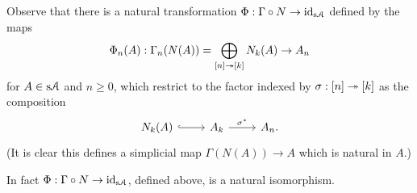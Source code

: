\begin{definition}
  Observe that there is
  a natural transformation $\Phi : \Gamma \circ N \to \operatorname{id}_{\mathrm{s}\mathcal{A}}$
  defined by the maps
  \[
  \Phi_n(A) : \Gamma_n(N(A)) = \bigoplus_{[n] \twoheadrightarrow [k]} N_k(A) \to A_n
  \]
  for $A \in \mathrm{s}\mathcal{A}$ and $n \ge 0$, which restrict to the factor indexed
  by $\sigma : [n] \twoheadrightarrow [k]$ as the composition
  \[
  \begin{tikzcd}
    N_k(A) \ar[hookrightarrow]{r} & A_k \rar{\sigma^*} & A_n.
  \end{tikzcd}
  \]
  (It is clear this defines a simplicial map $\Gamma(N(A)) \to A$ which
  is natural in $A$.)
\end{definition}

\begin{lemma}
  \label{gamma-n}
  In fact $\Phi : \Gamma \circ N \to \operatorname{id}_{\mathrm{s}\mathcal{A}}$, defined above, is a
  natural isomorphism.
\end{lemma}

